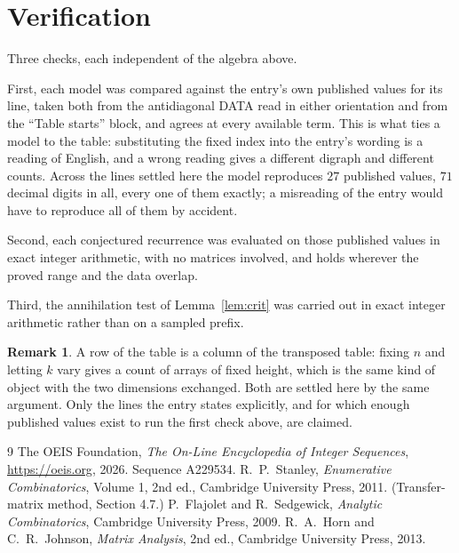 \documentclass[11pt,a4paper]{article}
\theoremstyle{plain}
\theoremstyle{definition}
\newtheorem{remark}[theorem]{Remark}
\begin{document}
\section{Verification}

Three checks, each independent of the algebra above.

First, each model was compared against the entry's own published values for its line, taken
both from the antidiagonal DATA read in either orientation and from the ``Table starts''
block, and agrees at every available term. This is what ties a model to the table:
substituting the fixed index into the entry's wording is a reading of English, and a wrong
reading gives a different digraph and different counts. Across the lines settled here the
model reproduces $27$ published values, $71$ decimal digits in all, every one of
them exactly; a misreading of the entry would have to reproduce all of them by accident.

Second, each conjectured recurrence was evaluated on those published values in exact
integer arithmetic, with no matrices involved, and holds wherever the proved range and the
data overlap.

Third, the annihilation test of Lemma~\ref{lem:crit} was carried out in exact integer
arithmetic rather than on a sampled prefix.

\begin{remark}
A row of the table is a column of the transposed table: fixing $n$ and letting $k$ vary gives a
count of arrays of fixed height, which is the same kind of object with the two dimensions
exchanged. Both are settled here by the same argument. Only the lines the entry states
explicitly, and for which enough published values exist to run the first check above, are
claimed.
\end{remark}

\begin{thebibliography}{9}
 The OEIS Foundation, \emph{The On-Line Encyclopedia of Integer
Sequences}, \url{https://oeis.org}, 2026. Sequence A229534.
 R.~P.~Stanley, \emph{Enumerative Combinatorics}, Volume 1, 2nd ed.,
Cambridge University Press, 2011. (Transfer-matrix method, Section 4.7.)
 P.~Flajolet and R.~Sedgewick, \emph{Analytic Combinatorics}, Cambridge
University Press, 2009.
 R.~A.~Horn and C.~R.~Johnson, \emph{Matrix Analysis}, 2nd ed., Cambridge
University Press, 2013.
\end{thebibliography}
\end{document}
